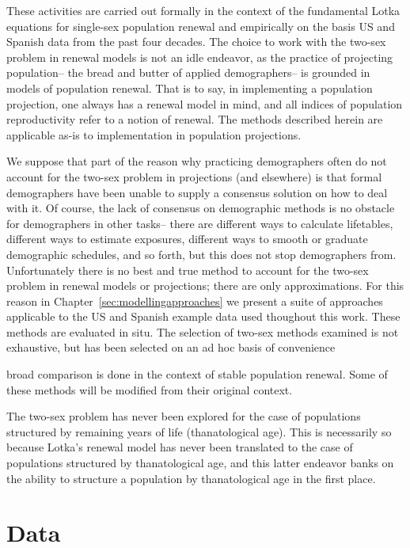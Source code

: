 These activities are carried out formally in the context of the fundamental
Lotka equations for single-sex population renewal and empirically on the basis 
US and Spanish data from the past four decades. The choice to work with the two-sex problem in
renewal models is not an idle endeavor, as the practice of projecting
population-- the bread and butter of applied demographers-- is grounded in
models of population renewal. That is to say, in implementing a population 
projection, one always has a renewal model in mind, and all indices of
population reproductivity refer to a notion of renewal. The methods
described herein are applicable as-is to implementation in population
projections.

We suppose that part of the reason why practicing
demographers often do not account for the two-sex problem in projections (and 
elsewhere) is that formal demographers have been unable to supply a
consensus solution on how to deal with it. Of course, the lack of consensus on
demographic methods is no obstacle for demographers in other tasks-- there are 
different ways to calculate lifetables, different ways to estimate exposures,
different ways to smooth or graduate demographic schedules, and so forth, but
this does not stop demographers from. Unfortunately there is no
best and true method to account for the two-sex problem in renewal models or 
projections; there are only approximations. For this reason in
Chapter~\ref{sec:modellingapproaches} we present a suite of 
approaches applicable to the US and Spanish example data 
used thoughout this work. These methods are evaluated in situ. The selection of
two-sex methods examined is not exhaustive, but has been selected on
an ad hoc basis of convenience



 broad
comparison is done in the context of stable population renewal. Some of these methods will be modified from their original context.

 The two-sex problem has never been
explored for the case of populations structured by remaining years of life (thanatological age). This is necessarily so because Lotka's renewal model has never been translated to the case of populations structured by thanatological age, and this latter endeavor banks on the ability to structure a population by thanatological age in the first place.


\section{Data}

